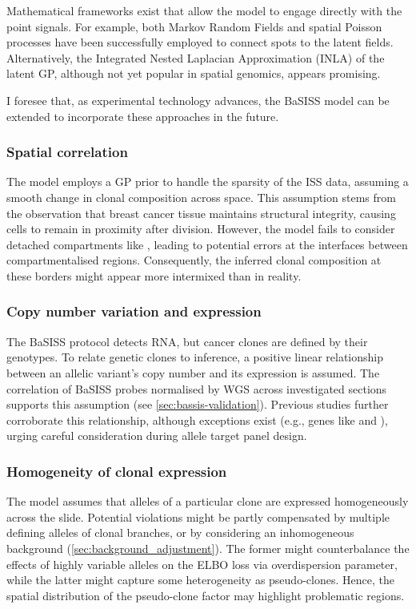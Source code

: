 Mathematical frameworks exist that allow the model to engage directly with the point signals. For example, both Markov Random Fields \parencite{Petukhov2022-qr} and spatial Poisson processes \parencite{Qian2020-hy} have been successfully employed to connect spots to the latent fields. Alternatively, the Integrated Nested Laplacian Approximation (INLA) \parencite{Rue2009-an} of the latent \ac{GP}, although not yet popular in spatial genomics, appears promising.

I foresee that, as experimental technology advances, the \ac{BaSISS} model can be extended to incorporate these approaches in the future.


\subsubsection*{Spatial correlation}
The model employs a \ac{GP} prior to handle the sparsity of the \ac{ISS} data, assuming a smooth change in clonal composition across space. This assumption stems from the observation that breast cancer tissue maintains structural integrity, causing cells to remain in proximity after division. However, the model fails to consider detached compartments like , leading to potential errors at the interfaces between compartmentalised regions. Consequently, the inferred clonal composition at these borders might appear more intermixed than in reality. 

\subsubsection*{Copy number variation and expression}
The \ac{BaSISS} protocol detects RNA, but cancer clones are defined by their genotypes. To relate genetic clones to inference, a positive linear relationship between an allelic variant's copy number and its expression is assumed. The correlation of \ac{BaSISS} probes normalised by \ac{WGS} across investigated sections supports this assumption (see \cref{sec:bassis-validation}). Previous studies further corroborate this relationship, although exceptions exist (e.g., genes like  and ), urging careful consideration during allele target panel design.

\subsubsection*{Homogeneity of clonal expression}
The model assumes that alleles of a particular clone are expressed homogeneously across the slide. Potential violations might be partly compensated by multiple defining alleles of clonal branches, or by considering an inhomogeneous background (\cref{sec:background_adjustment}). The former might counterbalance the effects of highly variable alleles on the \ac{ELBO} loss via overdispersion parameter, while the latter might capture some heterogeneity as pseudo-clones. Hence, the spatial distribution of the pseudo-clone factor may highlight problematic regions. 


